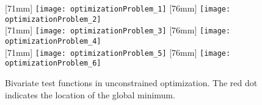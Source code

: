 \vspace*{1.9em}

\begin{figure}
  [71mm]{%
    \texttt{[image: optimizationProblem\_1]}%
  }%
  \hfill%
  [76mm]{%
    \texttt{[image: optimizationProblem\_2]}%
  }\\[2.5mm]%
  [71mm]{%
    \texttt{[image: optimizationProblem\_3]}%
  }%
  \hfill%
  [76mm]{%
    \texttt{[image: optimizationProblem\_4]}%
  }\\[2.5mm]%
  [71mm]{%
    \texttt{[image: optimizationProblem\_5]}%
  }%
  \hfill%
  [76mm]{%
    \texttt{[image: optimizationProblem\_6]}%
  }%
  \caption[%
    Unconstrained test problems%
  ]{%
    Bivariate test functions in unconstrained optimization.
    The \textcolor{C1}{red dot} indicates the location of the
    global minimum.%
  }%
  \label{fig:unconstrainedOptimizationProblem}%
\end{figure}
